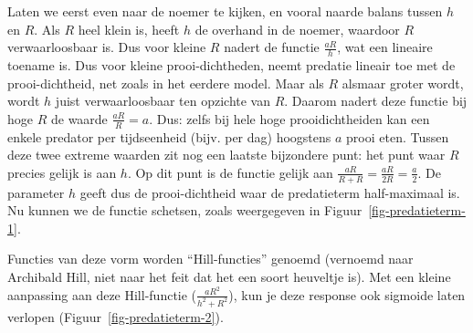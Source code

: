\documentclass[
  a4paper,
]{scrbook}
\theoremstyle{definition}
\theoremstyle{remark}
\begin{document}
Laten we eerst even naar de noemer te kijken, en vooral naarde balans
tussen \(h\) en \(R\). Als \(R\) heel klein is, heeft \(h\) de overhand
in de noemer, waardoor \(R\) verwaarloosbaar is. Dus voor kleine \(R\)
nadert de functie \(\frac{aR}{h}\), wat een lineaire toename is. Dus
voor kleine prooi-dichtheden, neemt predatie lineair toe met de
prooi-dichtheid, net zoals in het eerdere model. Maar als \(R\) alsmaar
groter wordt, wordt \(h\) juist verwaarloosbaar ten opzichte van \(R\).
Daarom nadert deze functie bij hoge \(R\) de waarde
\(\frac{aR}{R} = a\). Dus: zelfs bij hele hoge prooidichtheiden kan een
enkele predator per tijdseenheid (bijv. per dag) hoogstens \(a\) prooi
eten. Tussen deze twee extreme waarden zit nog een laatste bijzondere
punt: het punt waar \(R\) precies gelijk is aan \(h\). Op dit punt is de
functie gelijk aan \(\frac{aR}{R+R}=\frac{aR}{2R}=\frac{a}{2}\). De
parameter \(h\) geeft dus de prooi-dichtheid waar de predatieterm
half-maximaal is. Nu kunnen we de functie schetsen, zoals weergegeven in
Figuur~\ref{fig-predatieterm-1}.

Functies van deze vorm worden ``Hill-functies'' genoemd (vernoemd naar
Archibald Hill, niet naar het feit dat het een soort heuveltje is). Met
een kleine aanpassing aan deze Hill-functie (\(\frac{aR^2}{h^2+R^2}\)),
kun je deze response ook sigmoide laten verlopen
(Figuur~\ref{fig-predatieterm-2}).
\end{document}
